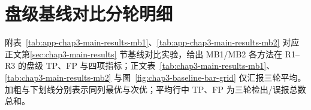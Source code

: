 {    \clearpage
    \section{盘级基线对比分轮明细}
    \label{sec:app-chap3-main-results}

    附表~\ref{tab:app-chap3-main-results-mb1}、\ref{tab:app-chap3-main-results-mb2} 对应正文第\ref{sec:chap3-main-results} 节基线对比实验，给出 MB1/MB2 各方法在 R1--R3 的盘级 TP、FP 与四项指标；正文表~\ref{tab:chap3-main-results-mb1}、\ref{tab:chap3-main-results-mb2} 与图~\ref{fig:chap3-baseline-bar-grid} 仅汇报三轮平均。加粗与下划线分别表示同列最优与次优；平均行中 TP、FP 为三轮检出/误报总数总和。

    \begin{table}[htbp]
        \centering
        \caption{\label{tab:app-chap3-main-results-mb1}MB1 盘级性能对比（分轮明细）}
        \setlength{\tabcolsep}{2pt}
        \renewcommand{\multirowsetup}{\centering}


\end{table}}
